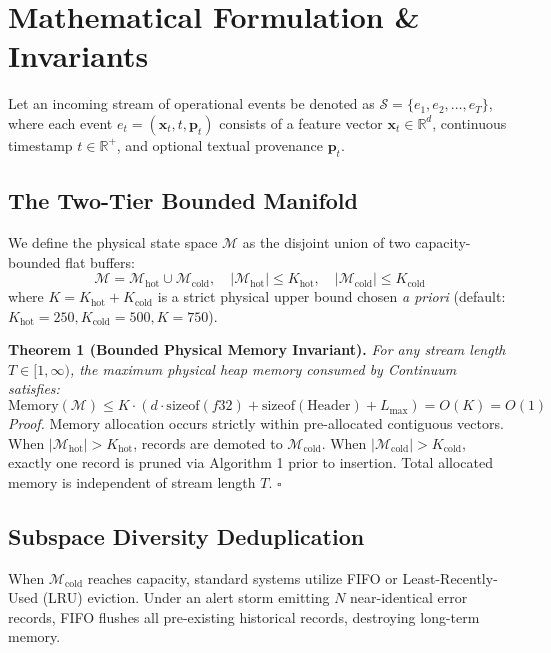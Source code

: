 \documentclass[10pt,journal,compsoc]{IEEEtran}
\begin{document}
\section{Mathematical Formulation \& Invariants}

Let an incoming stream of operational events be denoted as $\mathcal{S} = \{e_1, e_2, \dots, e_T\}$, where each event $e_t = (\mathbf{x}_t, t, \mathbf{p}_t)$ consists of a feature vector $\mathbf{x}_t \in \mathbb{R}^d$, continuous timestamp $t \in \mathbb{R}^+$, and optional textual provenance $\mathbf{p}_t$.

\subsection{The Two-Tier Bounded Manifold}
We define the physical state space $\mathcal{M}$ as the disjoint union of two capacity-bounded flat buffers:
\begin{equation}
\mathcal{M} = \mathcal{M}_{\text{hot}} \cup \mathcal{M}_{\text{cold}}, \quad |\mathcal{M}_{\text{hot}}| \le K_{\text{hot}}, \quad |\mathcal{M}_{\text{cold}}| \le K_{\text{cold}}
\end{equation}
where $K = K_{\text{hot}} + K_{\text{cold}}$ is a strict physical upper bound chosen \textit{a priori} (default: $K_{\text{hot}} = 250, K_{\text{cold}} = 500, K = 750$).

\textbf{Theorem 1 (Bounded Physical Memory Invariant).}
\textit{For any stream length $T \in [1, \infty)$, the maximum physical heap memory consumed by Continuum satisfies:}
\begin{equation}
\text{Memory}(\mathcal{M}) \le K \cdot \left( d \cdot \text{sizeof}(f32) + \text{sizeof}(\text{Header}) + L_{\text{max}} \right) = O(K) = O(1)
\end{equation}
\textit{Proof.} Memory allocation occurs strictly within pre-allocated contiguous vectors. When $|\mathcal{M}_{\text{hot}}| > K_{\text{hot}}$, records are demoted to $\mathcal{M}_{\text{cold}}$. When $|\mathcal{M}_{\text{cold}}| > K_{\text{cold}}$, exactly one record is pruned via Algorithm 1 prior to insertion. Total allocated memory is independent of stream length $T$. $\square$

\subsection{Subspace Diversity Deduplication}
When $\mathcal{M}_{\text{cold}}$ reaches capacity, standard systems utilize FIFO or Least-Recently-Used (LRU) eviction. Under an alert storm emitting $N$ near-identical error records, FIFO flushes all pre-existing historical records, destroying long-term memory.
\end{document}
